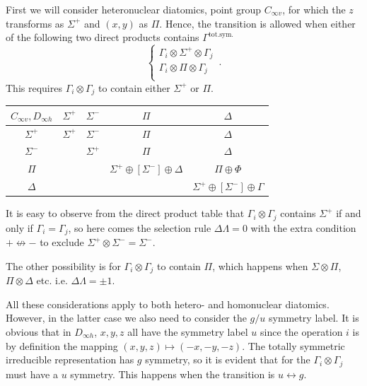 \documentclass{article}
\theoremstyle{plain}\theoremheaderfont{\normalfont\itshape}\theorembodyfont{\rmfamily}\theoremseparator{.}\newtheorem*{rem}{Remark}\newtheorem*{ex}{Example}\newtheorem*{proof}{Proof}\newtheorem*{altp}{Alternative proof}
\theoremstyle{plain}\theoremheaderfont{\normalfont\bfseries}\theorembodyfont{\rmfamily}\theoremseparator{.}\newtheorem{thm}{Theorem}[section]\newtheorem{lem}[thm]{Lemma}\newtheorem{prop}[thm]{Proposition}\newtheorem*{cor}{Corollary}\newtheorem{defn}[thm]{Definition}\newtheorem{clm}[thm]{Claim}\newtheorem{clminproof}{Claim}\newtheorem{pos}{Postulate}[section]
\theoremstyle{break}\theoremheaderfont{\normalfont\itshape}\theorembodyfont{\rmfamily}\theoremseparator{.\medskip}\newtheorem*{proofskip}{Proof}\newtheorem*{exs}{Examples}\newtheorem*{rems}{Remarks}
\theoremstyle{break}\theoremheaderfont{\normalfont\bfseries}\theorembodyfont{\rmfamily}\theoremseparator{.\medskip}\newtheorem{lemskip}[thm]{Lemma}\newtheorem{defnskip}[thm]{Definition}\newtheorem{propskip}[thm]{Proposition}\newtheorem{thmskip}[thm]{Theorem}
\numberwithin{equation}{section}
\begin{document}
    First we will consider heteronuclear diatomics, point group \(C_{\infty v}\), for which the \(z\) transforms as \(\Sigma^+\) and \((x,y)\) as \(\Pi\). Hence, the transition is allowed when either of the following two direct products contains \(\Gamma^{\text{tot.sym.}}\)
    \begin{equation}
        \begin{cases}
            \Gamma_i\otimes\Sigma^+\otimes\Gamma_j\\
            \Gamma_i\otimes\Pi\otimes\Gamma_j\\
        \end{cases}\,.
    \end{equation}
    This requires \(\Gamma_i\otimes\Gamma_j\) to contain either \(\Sigma^+\) or \(\Pi\).

    \begin{table}[ht!]
        \centering
        \begin{tabular}{c|cccc}
            \toprule
            \(C_{\infty v}, D_{\infty h}\) & \(\Sigma^+\) & \(\Sigma^-\) & \(\Pi\) & \(\Delta\) \\ \midrule
            \(\Sigma^+\) & \(\Sigma^+\) & \(\Sigma^-\) & \(\Pi\) & \(\Delta\) \\
            \(\Sigma^-\) & ~ & \(\Sigma^+\) & \(\Pi\) & \(\Delta\) \\
            \(\Pi\) & ~ & ~ & \(\Sigma^+ \oplus[\Sigma^-]\oplus\Delta\) & \(\Pi\oplus\Phi\) \\
            \(\Delta\) & ~ & ~ & ~ & \(\Sigma^+ \oplus[\Sigma^-]\oplus\Gamma\) \\ \bottomrule
        \end{tabular}
    \end{table}

    It is easy to observe from the direct product table that \(\Gamma_i\otimes\Gamma_j\) contains \(\Sigma^+\) if and only if \(\Gamma_i=\Gamma_j\), so here comes the selection rule \(\Delta\Lambda=0\) with the extra condition \(+\nleftrightarrow -\) to exclude \(\Sigma^+\otimes\Sigma^-=\Sigma^-\).

    The other possibility is for \(\Gamma_i\otimes\Gamma_j\) to contain \(\Pi\), which happens when \(\Sigma\otimes\Pi\), \(\Pi\otimes\Delta\) etc. i.e. \(\Delta\Lambda=\pm 1\).

    All these considerations apply to both hetero- and homonuclear diatomics. However, in the latter case we also need to consider the \(g/u\) symmetry label. It is obvious that in \(D_{\infty h}\), \(x,y,z\) all have the symmetry label \(u\) since the operation \(i\) is by definition the mapping \((x,y,z)\mapsto(-x,-y,-z)\). The totally symmetric irreducible representation has \(g\) symmetry, so it is evident that for the \(\Gamma_i\otimes\Gamma_j\) must have a \(u\) symmetry. This happens when the transition is \(u\leftrightarrow g\).
\end{document}
